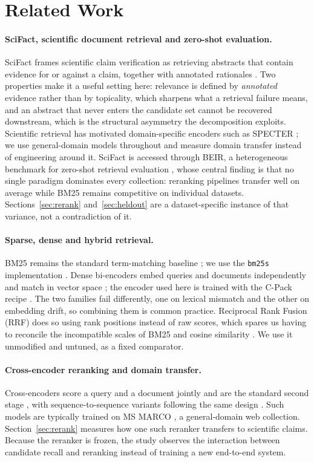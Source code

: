 \documentclass[11pt,a4paper]{article}
\begin{document}
\section{Related Work}

\paragraph{SciFact, scientific document retrieval and zero-shot evaluation.}
SciFact frames scientific claim verification as retrieving abstracts that contain evidence for
or against a claim, together with annotated rationales \citep{wadden2020scifact}. Two properties
make it a useful setting here: relevance is defined by \emph{annotated} evidence rather than by
topicality, which sharpens what a retrieval failure means, and an abstract that never enters the
candidate set cannot be recovered downstream, which is the structural asymmetry the
decomposition exploits. Scientific retrieval has motivated domain-specific encoders such as
SPECTER \citep{cohan2020specter}; we use general-domain models throughout and measure domain
transfer instead of engineering around it. SciFact is
accessed through BEIR, a heterogeneous benchmark for zero-shot retrieval evaluation
\citep{thakur2021beir}, whose central finding is that no single paradigm dominates every
collection: reranking pipelines transfer well on average while BM25 remains competitive on
individual datasets. Sections~\ref{sec:rerank} and~\ref{sec:heldout} are a dataset-specific
instance of that variance, not a contradiction of it.

\paragraph{Sparse, dense and hybrid retrieval.}
BM25 remains the standard term-matching baseline \citep{robertson2009bm25}; we use the
\texttt{bm25s} implementation \citep{lu2024bm25s}. Dense bi-encoders embed queries and documents
independently and match in vector space \citep{karpukhin2020dpr}; the encoder used here is
trained with the C-Pack recipe \citep{xiao2024cpack}. The two families fail differently, one on
lexical mismatch and the other on embedding drift, so combining them is common practice.
Reciprocal Rank Fusion (RRF) does so using rank positions instead of raw scores, which spares us
having to reconcile the incompatible scales of BM25 and cosine similarity
\citep{cormack2009rrf}. We use it unmodified and untuned, as a fixed comparator.

\paragraph{Cross-encoder reranking and domain transfer.}
Cross-encoders score a query and a document jointly and are the standard second stage
\citep{nogueira2019passage}, with sequence-to-sequence variants following the same design
\citep{nogueira2020monot5}. Such models are typically trained on MS MARCO
\citep{bajaj2016msmarco}, a general-domain web collection. Section~\ref{sec:rerank} measures how
one such reranker transfers to scientific claims. Because the reranker is frozen, the study
observes the interaction between candidate recall and reranking instead of training a new
end-to-end system.
\end{document}
